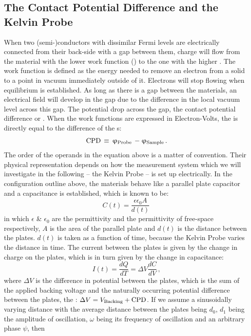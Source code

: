 \subsection{The Contact Potential Difference and the Kelvin Probe}
When two (semi-)conductors with dissimilar Fermi levels are electrically connected from their back-side with a gap between them, charge will flow from the material with the lower work function (\wf{}) to the one with the higher \wf{}. The work function is defined as the energy needed to remove an electron from a solid to a point in vacuum immediately outside of it. Electrons will stop flowing when equilibrium is established. As long as there is a gap between the materials, an electrical field will develop in the gap due to the difference in the local vacuum level across this gap. 
The potential drop across the gap, the contact potential difference or \cpd{}. When the work functions are expressed in Electron-Volts, the \cpd{} is directly equal to the difference of the \wf{}s:
\begin{equation}
\label{wf}
	{\text{CPD}} \, \equiv \,  \upvarphi _{\text{Probe}} \, - \upvarphi _{\text{Sample}} \, .
\end{equation}
The order of the operands in the equation above is a matter of convention. Their physical representation depends on how the measurement system which we will investigate in the following -- the Kelvin Probe -- is set up electrically. 
In the configuration outline above, the materials behave like a parallel plate capacitor and a capacitance is established, which is known to be:
\begin{equation}
\label{cap}
	C(t) = \frac{\epsilon \epsilon_0 A}{d(t)} \,
\end{equation}  
in which $\epsilon$ \& $\epsilon_0$ are the permittivity and the permittivity of free-space respectively, $A$ is the area of the parallel plate and $d(t)$ is the distance between the plates. $d(t)$ is taken as a function of time, because the Kelvin Probe varies the distance in time. The current between the plates is given by the change in charge on the plates, which is in turn given by the change in capacitance:
\begin{equation}
	I(t) = \frac{dQ}{dT}= \Delta V \frac{dC}{dV} \, ,
\end{equation}
where $\Delta V$ is the difference in potential between the plates, which is the sum of the applied backing voltage and the naturally occurring potential difference between the plates, the \cpd{}: $\Delta V = V_{\text{Backing}} + \text{CPD}$. If we assume a sinusoidally varying distance with the average distance between the plates being $d_0$, $d_1$ being the amplitude of oscillation, $\omega$ being its frequency of oscillation and an arbitrary phase $\psi$, then
